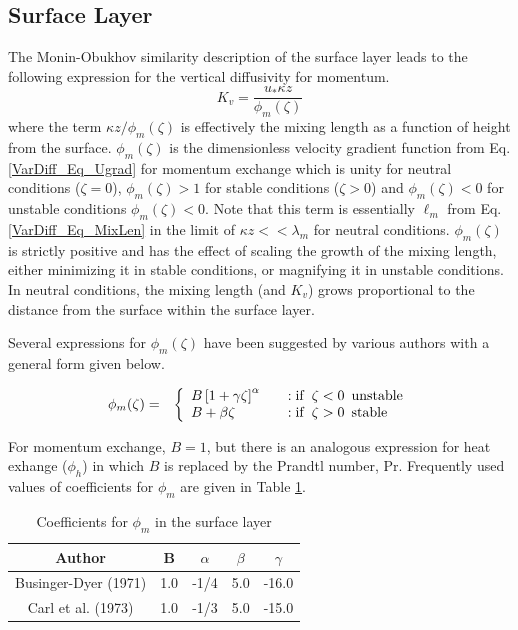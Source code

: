 \subsection{Surface Layer}

The Monin-Obukhov similarity description of the surface layer leads to the following
expression for the vertical diffusivity for momentum.
\begin{equation}\label{VarDiff_Eq_Kz_Surf}
K_v = \frac{u_{*} \kappa z}{\phi_m(\zeta)}
\end{equation}
where the term $\kappa z / \phi_m(\zeta)$ is effectively the mixing length as a function of height from the
surface.
$\phi_m(\zeta)$ is the dimensionless velocity gradient 
function from Eq. \ref{VarDiff_Eq_Ugrad} for momentum exchange which is unity for neutral conditions ($\zeta=0$),
$\phi_m(\zeta)>1$ for stable conditions ($\zeta>0$) and $\phi_m(\zeta)<0$ for unstable
conditions $\phi_m(\zeta)<0$.
Note that this term is essentially $\ell_m$ from Eq. \ref{VarDiff_Eq_MixLen} in the limit of
$\kappa z << \lambda_m$ for neutral conditions. $\phi_m(\zeta)$ is strictly positive and
has the effect of scaling the growth of the mixing length, either minimizing it in
stable conditions, or magnifying it in unstable conditions. In neutral conditions, the
mixing length (and $K_v$) grows proportional to the distance from the surface within the
surface layer. 

Several expressions for $\phi_m(\zeta)$ have been suggested by various authors with a
general form given below.

\begin{eqnarray}\label{VarDiff_Eq_PhiB}
\phi_m(\zeta) &=& \left\{ \begin{array} {l@{\quad \quad}l}
B \left[ 1+\gamma \zeta\right]^{\alpha}  &:  \mathrm{if}\,\,\, \zeta < 0 \,\,\, \mathrm{unstable} \\
B  + \beta \zeta                         &:  \mathrm{if}\,\,\, \zeta > 0 \,\,\, \mathrm{stable}
\end{array}
\right.
\end{eqnarray}

For momentum exchange, $B=1$, but there is an analogous expression for heat exhange ($\phi_h$)
in which $B$ is replaced by the Prandtl number, $\mathrm{Pr}$.
Frequently used values of coefficients for $\phi_m$ are given in Table \ref{Tab_VarDiff_phisurf}.
\small
\begin{table}[htbp]
\begin{center}
\begin{tabular}{| c | c | c | c | c |}
\hline
Author & B & $\alpha$ & $\beta$ & $\gamma$\\
\hline
Businger-Dyer (1971) \cite{Businger1971} & 1.0  & -1/4 & 5.0 & -16.0 \\
Carl et al. (1973)   \cite{Carl1973}     & 1.0  & -1/3 & 5.0 & -15.0 \\
\hline
\end{tabular}
\caption{\label{Tab_VarDiff_phisurf}Coefficients for $\phi_m$ in the surface layer \cite[Chap. 6.5.1-2]{Panofsky1984}}
\end{center}
\end{table}
\normalsize

